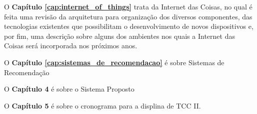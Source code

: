 O \textbf{Capítulo \ref{cap:internet_of_things}} trata da Internet das Coisas, no qual é feita uma revisão da arquitetura para organização dos diversos componentes, das tecnologias existentes que possibilitam o desenvolvimento de novos dispositivos e, por fim, uma descrição sobre alguns dos ambientes nos quais a Internet das Coisas será incorporada nos próximos anos.

O \textbf{Capítulo \ref{cap:sistemas_de_recomendacao}} é sobre Sistemas de Recomendação

O \textbf{Capítulo 4} é sobre o Sistema Proposto

O \textbf{Capítulo 5} é sobre o cronograma para a displina de TCC II.

	

